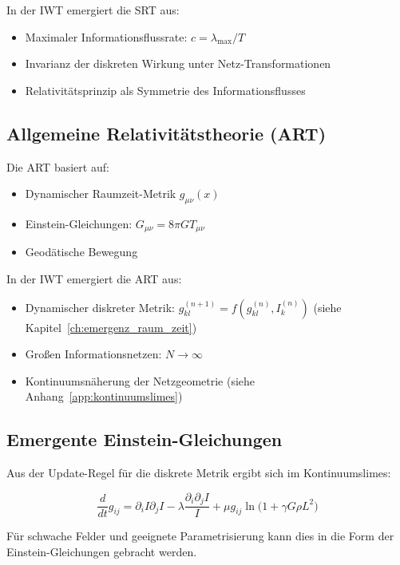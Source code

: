 In der IWT emergiert die SRT aus:

\begin{itemize}
    \item Maximaler Informationsflussrate: \( c = \lambda_{\max}/T \)
    \item Invarianz der diskreten Wirkung unter Netz-Transformationen
    \item Relativitätsprinzip als Symmetrie des Informationsflusses
\end{itemize}

\subsection{Allgemeine Relativitätstheorie (ART)}
\label{sub:vergleich_art}

Die ART basiert auf:

\begin{itemize}
    \item Dynamischer Raumzeit-Metrik \( g_{\mu\nu}(x) \)
    \item Einstein-Gleichungen: \( G_{\mu\nu} = 8\pi G T_{\mu\nu} \)
    \item Geodätische Bewegung
\end{itemize}

In der IWT emergiert die ART aus:

\begin{itemize}
    \item Dynamischer diskreter Metrik: \( g_{kl}^{(n+1)} = f(g_{kl}^{(n)}, I_k^{(n)}) \) (siehe Kapitel~\ref{ch:emergenz_raum_zeit})
    \item Großen Informationsnetzen: \( N \to \infty \)
    \item Kontinuumsnäherung der Netzgeometrie (siehe Anhang~\ref{app:kontinuumslimes})
\end{itemize}

\subsection{Emergente Einstein-Gleichungen}
\label{sub:vergleich_einstein}

Aus der Update-Regel für die diskrete Metrik ergibt sich im Kontinuumslimes:

\[
\frac{d}{dt} g_{ij} = \partial_i I \partial_j I - \lambda \frac{\partial_i \partial_j I}{I} + \mu g_{ij} \ln\!\bigl(1 + \gamma G \rho L^2\bigr)
\]

Für schwache Felder und geeignete Parametrisierung kann dies in die Form der Einstein-Gleichungen gebracht werden.

